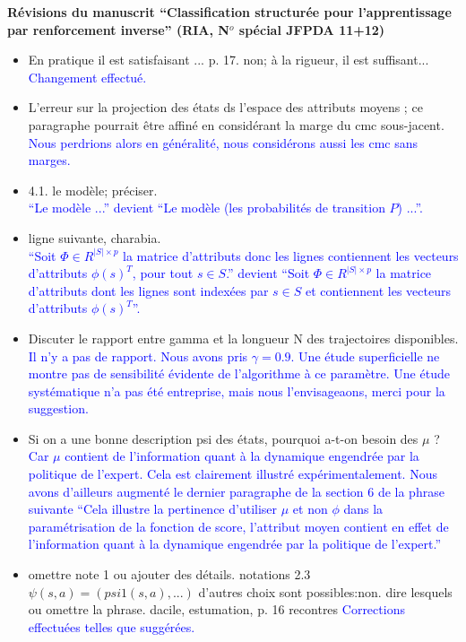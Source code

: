 \documentclass[11pt, a4paper]{letter}
\begin{document}
\begin{letter}{\large \textbf{Révisions du manuscrit ``Classification structurée pour l'apprentissage par renforcement inverse'' (RIA, N$^o$ spécial JFPDA 11+12)}}
\begin{itemize}
{\begin{eqnarray}
    v^{\pi_E} - v^{\pi_E})
 \end{eqnarray}
(1) est donné par l'inégalité (a) de notre contribution, le passage de (3) à (4) se fait grâce au Lemme 4.2 du papier de Munos (dans sa version HAL).
}
\item En pratique il est satisfaisant ... p. 17. non; à la rigueur, il est suffisant...\\
  \textcolor{blue}{Changement effectué.}
\item L'erreur sur la projection des états ds l'espace des attributs moyens ; ce paragraphe pourrait être affiné en considérant la marge du cmc sous-jacent.\\
  \textcolor{blue}{Nous perdrions alors en généralité, nous considérons aussi les cmc sans marges.}
\item 4.1.
le modèle; préciser.\\
 \textcolor{blue}{ ``Le modèle ...'' devient ``Le modèle (les probabilités de transition $P$) ...''.}
 \item ligne suivante, charabia.\\
 \textcolor{blue}{ ``Soit $\Phi\in R^{|S|\times p}$ la matrice d'attributs donc les lignes contiennent les vecteurs d'attributs $\phi(s)^T$, pour tout $s\in S$.'' devient ``Soit $\Phi\in R^{|S|\times p}$ la matrice d'attributs dont les lignes sont indexées par $s\in S$ et contiennent les vecteurs d'attributs $\phi(s)^T$''.}
 \item Discuter le rapport entre gamma et la longueur N des trajectoires disponibles.\\
 \textcolor{blue}{Il n'y a pas de rapport. Nous avons pris $\gamma = 0.9$. Une étude superficielle ne montre pas de sensibilité évidente de l'algorithme à ce paramètre. Une étude systématique n'a pas été entreprise, mais nous l'envisageaons, merci pour la suggestion.}
\item Si on a une bonne description psi des états, pourquoi a-t-on besoin des $\mu$ ?
\textcolor{blue}{Car $\mu$ contient de l'information quant à la dynamique engendrée par la politique de l'expert. Cela est clairement illustré expérimentalement. Nous avons d'ailleurs augmenté le dernier paragraphe de la section 6 de la phrase suivante ``Cela illustre la pertinence d'utiliser $\mu$ et non $\phi$ dans la paramétrisation de la fonction de score, l'attribut moyen contient en effet de l’information quant à la dynamique engendrée par la politique de l’expert.''}
\item
  omettre note 1 ou ajouter des détails.
notations 2.3 $\psi(s,a)= (psi1(s,a),...)$
d'autres choix sont possibles:non. dire lesquels ou omettre la phrase.
dacile, estumation, p. 16
recontres
\textcolor{blue}{Corrections effectuées telles que suggérées.
}
\end{itemize}





\end{letter}
\end{document}
